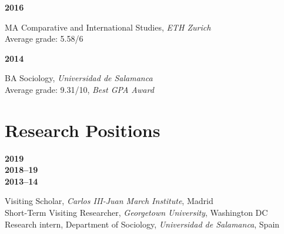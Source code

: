 \documentclass[a4paper, 12pt]{article}
\begin{document}
\vspace{10pt}

\noindent
\begin{minipage}[t]{0.1\textwidth}
  \flushleft
	\textbf{2016}
\end{minipage}
\begin{minipage}[t]{0.9\textwidth}
  MA Comparative and International Studies, {\it ETH Zurich}\\
  {\small Average grade: 5.58/6}\vspace{5pt}\\
\end{minipage}

\vspace{-10pt}

\noindent
\begin{minipage}[t]{0.1\textwidth}
  \flushleft
	\textbf{2014}
\end{minipage}
\begin{minipage}[t]{0.9\textwidth}
  BA Sociology, {\it Universidad de Salamanca}\\
  {\small Average grade: 9.31/10, \textit{Best GPA Award}}
\end{minipage}

\vspace{0pt}
\section*{Research Positions}

\begin{minipage}[t]{0.1\textwidth}
  \flushleft
  \textbf{2019}\\\vspace{7pt}
	\textbf{2018--19}\\\vspace{7pt}
	\textbf{2013--14}
\end{minipage}
\begin{minipage}[t]{0.9\textwidth}
  Visiting Scholar, {\it Carlos III-Juan March Institute}, Madrid\vspace{2pt}\\
	Short-Term Visiting Researcher, {\it Georgetown University}, Washington DC\vspace{2pt}\\
	Research intern, Department of Sociology, {\it Universidad de Salamanca}, Spain
\end{minipage}
\end{document}
